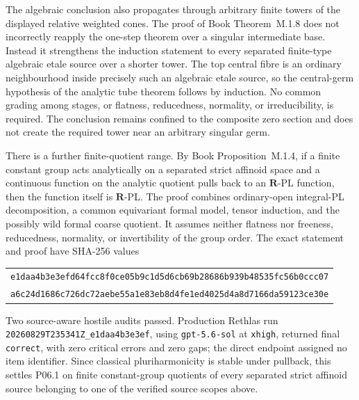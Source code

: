 \documentclass[11pt,a4paper]{article}
\theoremstyle{definition}
\theoremstyle{remark}
\begin{document}
The algebraic conclusion also propagates through arbitrary finite towers of
the displayed relative weighted cones.  The proof of
Book Theorem~M.1.8 does not incorrectly
reapply the one-step theorem over a singular intermediate base.  Instead it
strengthens the induction statement to every separated finite-type algebraic
etale source over a shorter tower.  The top central fibre is an ordinary
neighbourhood inside precisely such an algebraic etale source, so the
central-germ hypothesis of the analytic tube theorem follows by induction.
No common grading among stages, or flatness, reducedness, normality, or
irreducibility, is required.  The conclusion remains confined to the
composite zero section and does not create the required tower near an
arbitrary singular germ.

There is a further finite-quotient range.  By
Book Proposition~M.1.4, if a finite constant
group acts analytically on a separated strict affinoid space and a continuous
function on the analytic quotient pulls back to an \(\mathbf R\)-PL function,
then the function itself is \(\mathbf R\)-PL.  The proof combines
ordinary-open integral-PL decomposition, a common equivariant formal model,
tensor induction, and the possibly wild formal coarse quotient.  It assumes
neither flatness nor freeness, reducedness, normality, or invertibility of the
group order.  The exact statement and proof have SHA-256 values
\begin{center}
\small
\begin{tabular}{@{}c@{}}
\nolinkurl{e1daa4b3e3efd64fcc8f0ce05b9c1d5d6cb69b28686b939b48535fc56b0ccc07}\\
\nolinkurl{a6c24d1686c726dc72aebe55a1e83eb8d4fe1ed4025d4a8d7166da59123ce30e}
\end{tabular}
\end{center}
Two source-aware hostile audits passed.  Production Rethlas run
\nolinkurl{20260829T235341Z_e1daa4b3e3ef}, using
\texttt{gpt-5.6-sol} at \texttt{xhigh}, returned final
\texttt{correct}, with zero critical errors and zero gaps; the direct
endpoint assigned no item identifier.  Since classical pluriharmonicity is
stable under pullback, this settles P06.1 on finite constant-group quotients
of every separated strict affinoid source belonging to one of the verified
source scopes above.
\end{document}
